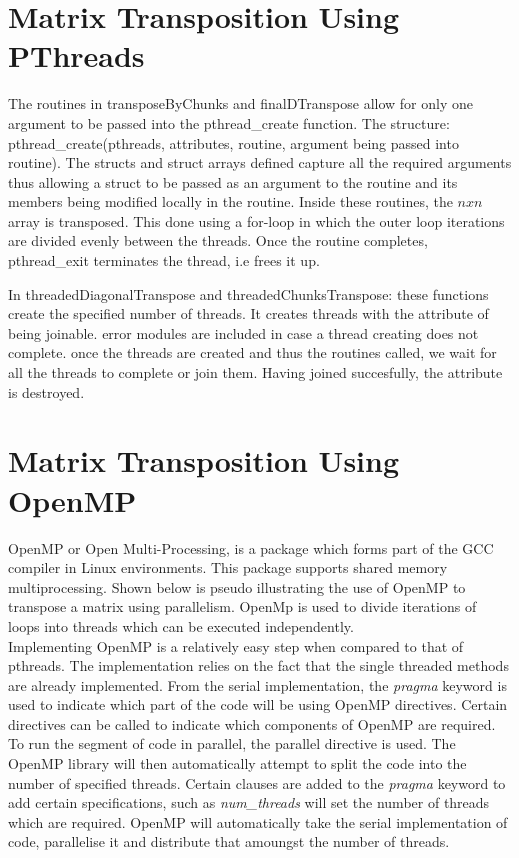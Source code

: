 \documentclass[a4paper, 11pt, onecolumn, conference]{IEEEtran}      %
\begin{document}
\section{Matrix Transposition Using PThreads}

The routines in transposeByChunks and finalDTranspose allow for only one argument to be passed into the pthread\_create function. The structure: pthread\_create(pthreads, attributes, routine, argument being passed into routine). The structs and struct arrays defined capture all the required arguments thus allowing a struct to be passed as an argument to the routine and its members being modified locally in the routine. Inside these routines, the $nxn$ array is transposed. This done using a for-loop in which the outer loop iterations are divided evenly between the threads. Once the routine completes, pthread\_exit terminates the thread, i.e frees it up.

In threadedDiagonalTranspose and threadedChunksTranspose: these functions create the specified number of threads. It creates threads with the attribute of being joinable. error modules are included in case a thread creating does not complete. once the threads are created and thus the routines called, we wait for all the threads to complete or join them. Having joined succesfully, the attribute is destroyed. 

\section{Matrix Transposition Using OpenMP}

OpenMP or Open Multi-Processing, is a package which forms part of the GCC compiler in Linux environments. This package supports shared memory multiprocessing\cite{utexas_getting_nodate}. Shown below is pseudo illustrating the use of OpenMP to transpose a matrix using parallelism. OpenMp is used to divide iterations of loops into threads which can be executed independently.\\

Implementing OpenMP is a relatively easy step when compared to that of pthreads. The implementation relies on the fact that the single threaded methods are already implemented. From the serial implementation, the \textit{pragma} keyword is used to indicate which part of the code will be using OpenMP directives\cite{utexas_getting_nodate}.  Certain directives can be called to indicate which components of OpenMP are required. To run the segment of code in parallel, the parallel directive is used. The OpenMP library will then automatically attempt to split the code into the number of specified threads\cite{utexas_getting_nodate}. Certain clauses are added to the \textit{pragma} keyword to add certain specifications, such as \textit{num\_threads} will set the number of threads which are required\cite{utexas_getting_nodate}. OpenMP will automatically take the serial implementation of code, parallelise it and distribute that amoungst the number of threads\cite{utexas_getting_nodate}.\\
\end{document}
